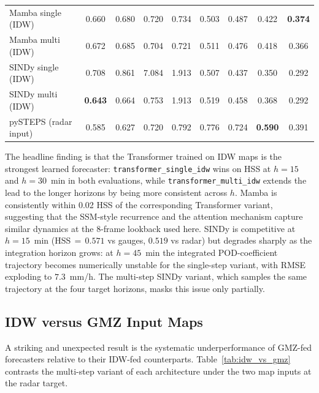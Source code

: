 \documentclass[12pt, a4paper]{article}
\begin{document}
\begin{table}[h]
\begin{tabular}{lcccccccc}
Mamba single (IDW)        & 0.660 & 0.680 & 0.720 & 0.734 & 0.503 & 0.487 & 0.422 & \textbf{0.374} \\
Mamba multi (IDW)         & 0.672 & 0.685 & 0.704 & 0.721 & 0.511 & 0.476 & 0.418 & 0.366 \\
SINDy single (IDW)        & 0.708 & 0.861 & 7.084 & 1.913 & 0.507 & 0.437 & 0.350 & 0.292 \\
SINDy multi (IDW)         & \textbf{0.643} & 0.664 & 0.753 & 1.913 & 0.519 & 0.458 & 0.368 & 0.292 \\
pySTEPS (radar input)     & 0.585 & 0.627 & 0.720 & 0.792 & 0.776 & 0.724 & \textbf{0.590} & 0.391 \\
\bottomrule
\end{tabular}
\end{table}

The headline finding is that the Transformer trained on IDW maps is
the strongest learned forecaster: \texttt{transformer\_single\_idw}
wins on HSS at $h\!=\!15$ and $h\!=\!30$~min in both evaluations,
while \texttt{transformer\_multi\_idw} extends the lead to the longer
horizons by being more consistent across $h$. Mamba is consistently
within 0.02 HSS of the corresponding Transformer variant, suggesting
that the SSM-style recurrence and the attention mechanism capture
similar dynamics at the 8-frame lookback used here. SINDy is
competitive at $h\!=\!15$~min (HSS$\,=\,0.571$ vs gauges, $0.519$ vs
radar) but degrades sharply as the integration horizon grows: at
$h\!=\!45$~min the integrated POD-coefficient trajectory becomes
numerically unstable for the single-step variant, with RMSE
exploding to $7.3$~mm/h. The multi-step SINDy variant, which samples
the same trajectory at the four target horizons, masks this issue
only partially.

\subsection{IDW versus GMZ Input Maps}\label{sec:results:idw_vs_gmz}

A striking and unexpected result is the systematic underperformance
of GMZ-fed forecasters relative to their IDW-fed counterparts.
Table~\ref{tab:idw_vs_gmz} contrasts the multi-step variant of each
architecture under the two map inputs at the radar target.
\end{document}
